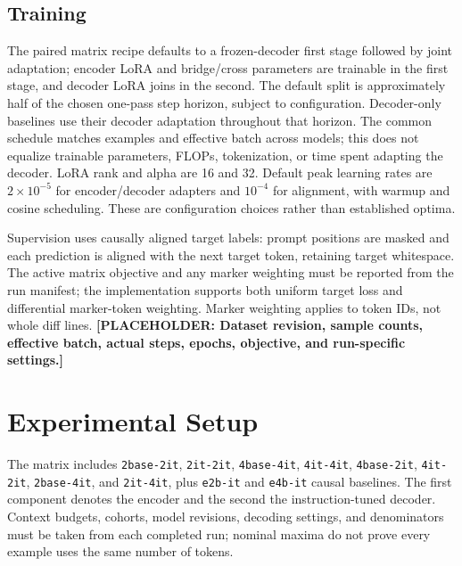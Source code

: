 \documentclass[10pt,twocolumn]{article}
\begin{document}
\subsection{Training}
The paired matrix recipe defaults to a frozen-decoder first stage followed by joint adaptation; encoder LoRA and bridge/cross parameters are trainable in the first stage, and decoder LoRA joins in the second. The default split is approximately half of the chosen one-pass step horizon, subject to configuration. Decoder-only baselines use their decoder adaptation throughout that horizon. The common schedule matches examples and effective batch across models; this does not equalize trainable parameters, FLOPs, tokenization, or time spent adapting the decoder. LoRA rank and alpha are 16 and 32. Default peak learning rates are $2\times10^{-5}$ for encoder/decoder adapters and $10^{-4}$ for alignment, with warmup and cosine scheduling. These are configuration choices rather than established optima.

Supervision uses causally aligned target labels: prompt positions are masked and each prediction is aligned with the next target token, retaining target whitespace. The active matrix objective and any marker weighting must be reported from the run manifest; the implementation supports both uniform target loss and differential marker-token weighting. Marker weighting applies to token IDs, not whole diff lines. \textbf{[PLACEHOLDER: Dataset revision, sample counts, effective batch, actual steps, epochs, objective, and run-specific settings.]}
\section{Experimental Setup}
The matrix includes \texttt{2base-2it}, \texttt{2it-2it}, \texttt{4base-4it}, \texttt{4it-4it}, \texttt{4base-2it}, \texttt{4it-2it}, \texttt{2base-4it}, and \texttt{2it-4it}, plus \texttt{e2b-it} and \texttt{e4b-it} causal baselines. The first component denotes the encoder and the second the instruction-tuned decoder. Context budgets, cohorts, model revisions, decoding settings, and denominators must be taken from each completed run; nominal maxima do not prove every example uses the same number of tokens.
\end{document}
